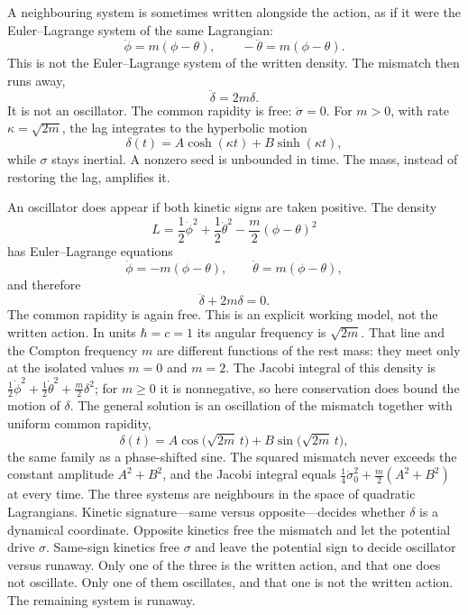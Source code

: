 \documentclass[a4paper]{article}
\begin{document}
A neighbouring system is sometimes written alongside the action, as if it were the Euler--Lagrange system of the same Lagrangian:
\begin{equation}
\ddot\phi=m(\phi-\theta),\qquad
-\ddot\theta=m(\phi-\theta).
\label{eq:claimed}
\end{equation}
This is not the Euler--Lagrange system of the written density. The mismatch then runs away,
\begin{equation}
\ddot\delta=2m\delta.
\label{eq:runaway}
\end{equation}
It is not an oscillator. The common rapidity is free: \(\ddot\sigma=0\). For \(m>0\), with rate \(\kappa=\sqrt{2m}\), the lag integrates to the hyperbolic motion
\[
\delta(t)=A\cosh(\kappa t)+B\sinh(\kappa t),
\]
while \(\sigma\) stays inertial. A nonzero seed is unbounded in time. The mass, instead of restoring the lag, amplifies it.

An oscillator does appear if both kinetic signs are taken positive. The density
\[
L
  =\frac12\dot\phi^2
  +\frac12\dot\theta^2
  -\frac m2(\phi-\theta)^2
\]
has Euler--Lagrange equations
\[
\ddot\phi=-m(\phi-\theta),\qquad
\ddot\theta=m(\phi-\theta),
\]
and therefore
\begin{equation}
\ddot\delta+2m\delta=0.
\label{eq:oscillator}
\end{equation}
The common rapidity is again free. This is an explicit working model, not the written action. In units \(\hbar=c=1\) its angular frequency is \(\sqrt{2m}\). That line and the Compton frequency \(m\) are different functions of the rest mass: they meet only at the isolated values \(m=0\) and \(m=2\). The Jacobi integral of this density is \(\frac12\dot\phi^2+\frac12\dot\theta^2+\frac m2\delta^2\); for \(m\ge 0\) it is nonnegative, so here conservation does bound the motion of \(\delta\). The general solution is an oscillation of the mismatch together with uniform common rapidity,
\[
\delta(t)=A\cos\bigl(\sqrt{2m}\,t\bigr)+B\sin\bigl(\sqrt{2m}\,t\bigr),
\]
the same family as a phase-shifted sine. The squared mismatch never exceeds the constant amplitude \(A^2+B^2\), and the Jacobi integral equals \(\frac14\dot\sigma_0^2+\frac m2(A^2+B^2)\) at every time.
The three systems are neighbours in the space of quadratic Lagrangians. Kinetic signature---same versus opposite---decides whether \(\delta\) is a dynamical coordinate. Opposite kinetics free the mismatch and let the potential drive \(\sigma\). Same-sign kinetics free \(\sigma\) and leave the potential sign to decide oscillator versus runaway. Only one of the three is the written action, and that one does not oscillate. Only one of them oscillates, and that one is not the written action. The remaining system is runaway.
\end{document}
